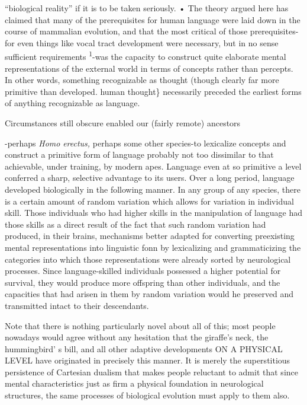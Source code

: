 ``biological reality'' if it is to be taken seriously. • The theory argued here has claimed that many of the prerequisites for human language were laid down in the course of mammalian evolution, and that the most critical of those prerequisites- for even things like vocal tract development were necessary, but in no sense
sufficient requirements \textsuperscript{1}{}-was the capacity to construct quite elaborate
mental representations of the external world in terms of concepts rather than percepts. In other words, something recognizable as thought (though clearly far more primitive than developed. human thought\} necessarily preceded the earliest forms of anything recognizable as language.

Circumstances still obscure enabled our (fairly remote) ancestors

{}-perhaps \textit{Homo} \textit{erectus,} perhaps some other species{}-to lexicalize concepts and construct a primitive form of language probably not too dissimilar to that achievable, under training, by modern apes. Language even at so primitive a level conferred a sharp, selective advantage to its users. Over a long period, language developed biologically in the follow\-ing manner. In any group of any species, there is a certain amount of random variation which allows for variation in individual skill. Those individuals who had higher skills in the manipulation of language had those skills as a direct result of the fact that such random variation had produced, in their brains, mechanisms better adapted for converting preexisting mental representations into linguistic fonn by lexicalizing and grammaticizing the categories into which those representations were already sorted by neurological processes. Since language-skilled individuals possessed a higher potential for survival, they would pro\-duce more offspring than other individuals, and the capacities that had arisen in them by random variation would he preserved and trans\-mitted intact to their descendants.

Note that there is nothing particularly novel about all of this; most people nowadays would agree without any hesitation that the giraffe's neck, the hummingbird' s bill, and all other adaptive develop\-ments ON A PHYSICAL LEVEL have originated in precisely this manner. It is merely the superstitious persistence of Cartesian dualism that makes people reluctant to admit that since mental characteristics just as firm a physical foundation in neurological structures,
the same processes of biological evolution must apply to them also.

